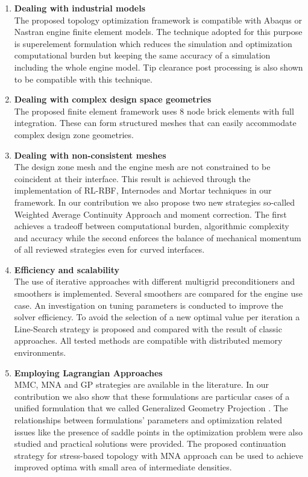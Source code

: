 \begin{enumerate}
	\item \textbf{Dealing with industrial models}\\
	The proposed topology optimization framework is compatible with Abaqus or Nastran engine finite element models. The technique adopted for this purpose is superelement formulation  which reduces the simulation and optimization computational burden but keeping the same accuracy of a simulation including the whole engine model. Tip clearance post processing is also shown to be compatible with this technique.
	\item \textbf{Dealing with complex design space geometries}\\
	The proposed finite element framework uses 8 node brick elements with full integration. These can form structured meshes that can easily accommodate complex design zone geometries. 
	\item \textbf{Dealing with non-consistent meshes}\\
	The design zone mesh and the engine mesh are not constrained to be coincident at their interface. This result is achieved through the implementation of RL-RBF, Internodes and Mortar techniques in our framework. In our contribution \cite{coniglio2018weighted} we also propose two new strategies so-called Weighted Average Continuity Approach and moment correction. The first achieves a tradeoff between computational burden, algorithmic complexity and accuracy while the second enforces the balance of mechanical momentum of all reviewed strategies even for curved interfaces.
	\item \textbf{Efficiency and scalability}\\
	The use of iterative approaches with different multigrid preconditioners and smoothers is implemented. Several smoothers are compared for the engine use case. An investigation on tuning parameters is conducted to improve the solver efficiency. To avoid the selection of a new optimal value per iteration a Line-Search strategy is proposed and compared with the result of classic approaches.  All tested methods are compatible with distributed memory environments.
	\item \textbf{Employing Lagrangian Approaches}\\
	MMC, MNA and GP strategies are available in the literature.  In our contribution we also show that these formulations are particular cases of a unified formulation that we called Generalized Geometry Projection \cite{coniglio2019generalized}. The relationships between formulations' parameters and optimization related issues like the presence of saddle points in the optimization problem were also studied and practical solutions were provided. The proposed continuation strategy for stress-based topology with MNA approach can be used to achieve improved optima with small area of intermediate densities. 

\end{enumerate}
